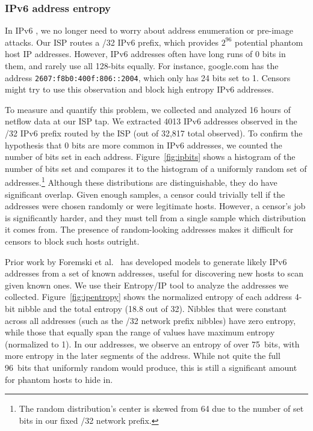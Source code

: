 \documentclass[sigconf,anonymous]{acmart}
\begin{document}
\subsubsection{IPv6 address entropy}
\FigIpBits

In IPv6 \scheme, we no longer need to worry about address enumeration or
pre-image attacks. Our ISP routes a /32 IPv6 prefix, which provides $2^{96}$ potential
phantom host IP addresses. However, IPv6 addresses often have long runs of 0
bits in them, and rarely use all 128-bits equally.
For instance, google.com has the address
\texttt{2607:f8b0:400f:806::2004}, which only has 24 bits set to 1.
Censors might try to use this observation and block high entropy IPv6 addresses.

To measure and quantify this problem, we collected and analyzed 16 hours of
netflow data at our ISP tap. We extracted 4013 IPv6 addresses observed in the /32
IPv6 prefix routed by the ISP (out of 32,817 total observed). To confirm the
hypothesis that 0 bits are more common in IPv6 addresses, we counted the number
of bits set in each address. Figure~\ref{fig:ipbits} shows a histogram of the
number of bits set and compares it to the histogram of a uniformly random set of
addresses.\footnote{The random distribution's center is skewed from 64 due to
the number of set bits in our fixed /32 network prefix.} Although these
distributions are distinguishable, they do have significant overlap. Given
enough samples, a censor could trivially tell if the addresses were chosen
randomly or were legitimate hosts. However, a censor's job is significantly
harder, and they must tell from a single sample which distribution it comes
from. The presence of random-looking addresses makes it difficult for censors to
block such hosts outright.


\FigIpEntropy

Prior work by Foremski et al.~\cite{foremski2016entropy} has developed models to
generate likely IPv6 addresses from a set of known addresses, useful for
discovering new hosts to scan given known ones. We use their Entropy/IP tool to
analyze the addresses we collected. Figure~\ref{fig:ipentropy} shows the
normalized entropy of each address 4-bit nibble and the total entropy (18.8 out
of 32). Nibbles that were constant across all addresses
(such as the /32 network prefix nibbles) have zero entropy, while those that
equally span the range of values have maximum entropy (normalized to 1). In our
addresses, we observe an entropy of over 75~bits, with more entropy in the later
segments of the address. While not quite the full 96~bits that uniformly random
would produce, this is still a significant amount for phantom hosts to hide in.
\end{document}
